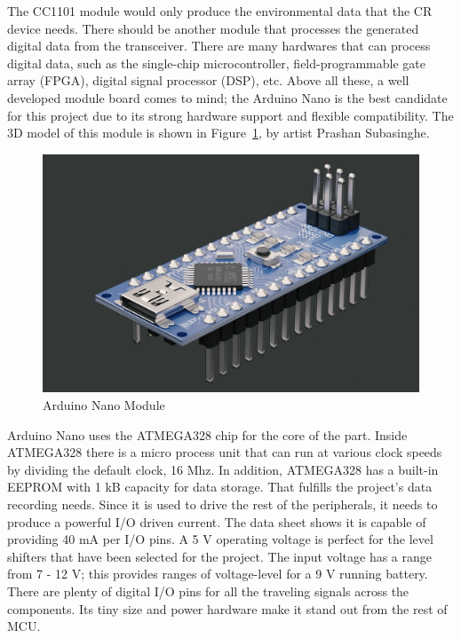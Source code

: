 The CC1101 module would only produce the environmental data that the CR device needs. There should be another module that processes the generated digital data from the transceiver. There are many hardwares that can process digital data, such as the single-chip microcontroller, field-programmable gate array (FPGA), digital signal processor (DSP), etc. Above all these, a well developed module board comes to mind; the Arduino Nano is the best candidate for this project due to its strong hardware support and flexible compatibility. The 3D model of this module is shown in Figure~\ref{fig:arduino_nano}, by artist Prashan Subasinghe.


\begin{figure}[ht]
\centering
\includegraphics[width=12cm]{figures/arduino_nano.jpg}
\caption{Arduino Nano Module \cite{arduino_nano}}
\label{fig:arduino_nano}
\end{figure}

Arduino Nano uses the ATMEGA328 chip for the core of the part. Inside ATMEGA328 there is a micro process unit that can run at various clock speeds by dividing the default clock, 16 Mhz. In addition, ATMEGA328 has a built-in EEPROM with 1 kB capacity for data storage. That fulfills the project's data recording needs. Since it is used to drive the rest of the peripherals, it needs to produce a powerful I/O driven current. The data sheet shows it is capable of providing 40 mA per I/O pins. A 5 V operating voltage is perfect for the level shifters that have been selected for the project. The input voltage has a range from 7 - 12 V; this provides ranges of voltage-level for a 9 V running battery. There are plenty of digital I/O pins for all the traveling signals across the components. Its tiny size and power hardware make it stand out from the rest of MCU.


